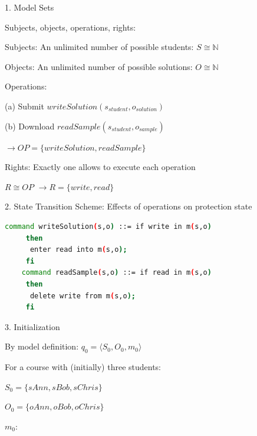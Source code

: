 \documentclass[a4paper]{article}
\begin{document}
\begin{multicols}{3}
    1. Model Sets
    \begin{itemize*}
        \item Subjects, objects, operations, rights:
        \begin{itemize*}
            \item Subjects: An unlimited number of possible students: $S\cong\mathbb{N}$
            \item Objects: An unlimited number of possible solutions: $O\cong\mathbb{N}$
            \item Operations:
            \begin{itemize*}
                \item (a) Submit $writeSolution(s_{student},o_{solution})$
                \item (b) Download $readSample(s_{student},o_{sample})$
                \item $\rightarrow OP=\{writeSolution, readSample\}$
            \end{itemize*}
            \item Rights: Exactly one allows to execute each operation
            \begin{itemize*}
                \item $R\cong OP$ $\rightarrow R=\{write, read\}$
            \end{itemize*}
        \end{itemize*}
    \end{itemize*}
    2. State Transition Scheme: Effects of operations on protection state
    \begin{lstlisting}[language=Bash,showspaces=false]
    command writeSolution(s,o) ::= if write in m(s,o) 
     then 
      enter read into m(s,o);
     fi
    command readSample(s,o) ::= if read in m(s,o)
     then
      delete write from m(s,o);
     fi
 \end{lstlisting}
    3. Initialization
    \begin{itemize*}
        \item By model definition: $q_0 =\langle S_0 ,O_0 ,m_0 \rangle$
        \item For a course with (initially) three students:
        \begin{itemize*}
            \item $S_0 =\{sAnn, sBob, sChris\}$
            \item $O_0 =\{oAnn, oBob, oChris\}$
            \item $m_0$:
            \begin{itemize*}

\end{itemize*}
\end{itemize*}
\end{itemize*}
\end{multicols}
\end{document}
